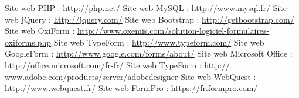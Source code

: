 \documentclass{sigplanconf}
\begin{document}
\appendix








\begin{thebibliography}{}
\softraggedright
{} Site web PHP : \url{http://php.net/}
 Site web MySQL : \url{http://www.mysql.fr/}
 Site web jQuery : \url{http://jquery.com/}
 Site web Bootstrap : \url{http://getbootstrap.com/}
 Site web OxiForm : \url{http://www.oxemis.com/solution-logiciel-formulaires-oxiforms.php}
 Site web TypeForm : \url{http://www.typeform.com/}
 Site web GoogleForm : \url{http://www.google.com/forms/about/}
 Site web Microsoft Office : \url{http://office.microsoft.com/fr-fr/}
 Site web TypeForm : \url{http:// www.adobe.com/products/server/adobedesigner}
 Site web WebQuest : \url{http://www.webquest.fr/}
 Site web FormPro : \url{https://fr.formpro.com/}

\end{thebibliography}
\end{document}
